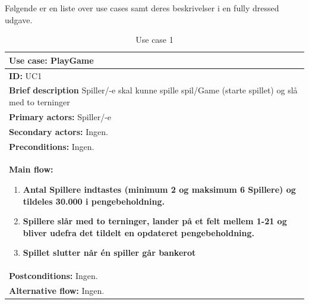 Følgende er en liste over use cases samt deres beskrivelser i en fully dressed udgave.


\begin{table}[H]
    \begin{center}
        \begin{tabular}{ | p{15cm} |}
            \hline
            \textbf{Use case:} PlayGame \\ \hline
            \textbf{ID:} UC1 \\ \hline
            \textbf{Brief description} Spiller/-e skal kunne spille spil/Game (starte spillet) og slå med to terninger     \\ \hline
            \textbf{Primary actors:} Spiller/-e \\ \hline
            \textbf{Secondary actors:} Ingen. \\ \hline
            \textbf{Preconditions:} Ingen.     \\ \hline
            \textbf{Main flow:}
            \begin{enumerate}
                \item \textbf{Antal Spillere indtastes (minimum 2 og maksimum 6 Spillere) og tildeles 30.000 i pengebeholdning.}
                \item \textbf{Spillere slår med to terninger, lander på et felt mellem 1-21 og bliver udefra det tildelt en opdateret pengebeholdning.}
                \item \textbf{Spillet slutter når én spiller går bankerot}
            \end{enumerate} \\ \hline
            \textbf{Postconditions:} Ingen.\\ \hline
            \textbf{Alternative flow:} Ingen.\\ \hline
            \hline
        \end{tabular}
        \caption{Use case 1}
        \label{usecase:1}
    \end{center}
\end{table}

